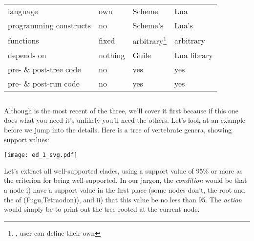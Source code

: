 \begin{center}
	\begin{minipage}{0.8\textwidth}
		\renewcommand{\thefootnote}{\thempfootnote}
		\begin{tabular}{llll}
		& \ed & \sched & \luaed \\
		\hline
		language & own & Scheme & Lua \\
		programming constructs & no & Scheme's & Lua's \\
		functions & fixed & arbitrary\footnote{\ie, user can define their own} &
		arbitrary\footnotemark[\value{mpfootnote}] \\
		depends on & nothing & \gnu{} Guile & Lua library \\
		pre- \& post-tree code & no & yes & yes \\
		pre- \& post-run code & no & yes & yes
		\end{tabular}
	\end{minipage}
\end{center}

\subsection{\luaed}

Although \luaed{} is the most recent of the three, we'll cover it first because
if this one does what you need it's unlikely you'll need the others.  Let's look
at an example before we jump into the details. Here is a tree of vertebrate
genera, showing support values:


\begin{center}
\texttt{[image: ed\_1\_svg.pdf]}
\end{center}

\noindent{}Let's extract all well-supported clades, using a support value of
95\% or more as the criterion for being well-supported. In our jargon, the
\emph{condition} would be that a node i) have a support value in the first place
(some nodes don't, \eg{} the root and the \lca{} of (Fugu,Tetraodon)), and ii)
that this value be no less than 95. The \emph{action} would simply be to print
out the tree rooted at the current node.


\begin{samepage}

\end{samepage}

